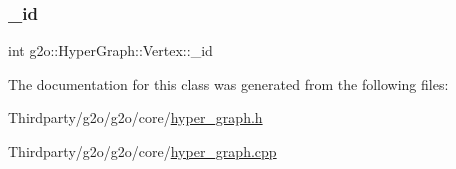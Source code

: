 \subsubsection{\texorpdfstring{\+\_\+id}{\_id}}
{\footnotesize\ttfamily int g2o\+::\+Hyper\+Graph\+::\+Vertex\+::\+\_\+id\hspace{0.3cm}{\ttfamily [protected]}}



The documentation for this class was generated from the following files\+:\begin{DoxyCompactItemize}
\item 
Thirdparty/g2o/g2o/core/\mbox{\hyperlink{hyper__graph_8h}{hyper\+\_\+graph.\+h}}\item 
Thirdparty/g2o/g2o/core/\mbox{\hyperlink{hyper__graph_8cpp}{hyper\+\_\+graph.\+cpp}}\end{DoxyCompactItemize}

